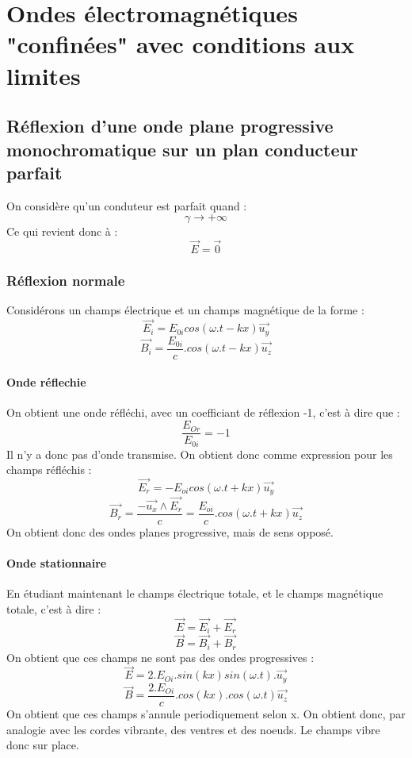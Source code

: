 
\chapter{Ondes électromagnétiques "confinées" avec conditions aux limites}
\section{Réflexion d'une onde plane progressive monochromatique sur un plan conducteur parfait}
\begin{de}
On considère qu'un conduteur est parfait quand : 
$$\gamma\rightarrow +\infty$$
Ce qui revient donc à :
$$\overrightarrow{E} = \overrightarrow{0}$$
\end{de}
\subsection{Réflexion normale}
Considérons un champs électrique et un champs magnétique de la forme : 
$$\overrightarrow{E_i} = E_{0i}cos(\omega.t-kx)\overrightarrow{u_y}$$
$$\overrightarrow{B_i} = \dfrac{E_{0i}}{c}.cos(\omega.t - kx)\overrightarrow{u_z}$$
\subsubsection{Onde réflechie}
On obtient une onde réfléchi, avec un coefficiant de réflexion -1, c'est à dire que :
$$\dfrac{E_{Or}}{E_{0i}} = -1$$
Il n'y a donc pas d'onde transmise. On obtient donc comme expression pour les champs réfléchis :
$$\overrightarrow{E_r} = -E_{oi}cos(\omega.t+kx)\overrightarrow{u_y}$$
$$\overrightarrow{B_r} =\dfrac{-\overrightarrow{u_x}\wedge\overrightarrow{E_r}}{c} = \dfrac{E_{oi}}{c}.cos(\omega.t+kx)\overrightarrow{u_z}$$
On obtient donc des ondes planes progressive, mais de sens opposé.
\subsubsection{Onde stationnaire}
En étudiant maintenant le champs électrique totale, et le champs magnétique totale, c'est à dire : 
$$\overrightarrow{E} = \overrightarrow{E_i} + \overrightarrow{E_r}$$
$$\overrightarrow{B} = \overrightarrow{B_i} + \overrightarrow{B_r}$$
On obtient que ces champs ne sont pas des ondes progressives :
$$\overrightarrow{E} = 2.E_{Oi}.sin(kx)sin(\omega.t).\overrightarrow{u_y}$$
$$\overrightarrow{B} = \dfrac{2.{E_{Oi}}}{c}.cos(kx).cos(\omega.t)\overrightarrow{u_z}$$
On obtient que ces champs s'annule periodiquement selon x. On obtient donc, par analogie avec les cordes vibrante, des ventres et des noeuds. Le champs vibre donc sur place.

